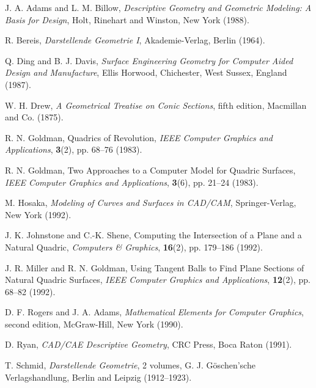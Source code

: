 \newpage
\begin{thebibliography}{99}

     J. A. Adams and L. M. Billow,
     {\em Descriptive Geometry and Geometric Modeling: A Basis for Design},
     Holt, Rinehart and Winston, New York (1988).

     R. Bereis,
     {\em Darstellende Geometrie I},
     Akademie-Verlag, Berlin (1964).

     Q. Ding and B. J. Davis,
     {\em Surface Engineering Geometry for Computer Aided Design and
          Manufacture},
     Ellis Horwood, Chichester, West Sussex, England (1987).

     W. H. Drew,
     {\em A Geometrical Treatise on Conic Sections},
     fifth edition,
     Macmillan and Co. (1875).

     R. N. Goldman,
     Quadrics of Revolution,
     {\em IEEE Computer Graphics and Applications},
     {\bf 3}(2), pp. 68--76 (1983).

     R. N. Goldman,
     Two Approaches to a Computer Model for Quadric Surfaces,
     {\em IEEE Computer Graphics and Applications},
     {\bf 3}(6), pp. 21--24 (1983).

     M. Hosaka,
     {\em Modeling of Curves and Surfaces in CAD/CAM},
     Springer-Verlag, New York (1992).

     J. K. Johnstone and C.-K. Shene,
     Computing the Intersection of a Plane and a Natural Quadric,
     {\em Computers \& Graphics},
     {\bf 16}(2), pp. 179--186 (1992).

     J. R. Miller and R. N. Goldman,
     Using Tangent Balls to Find Plane Sections of Natural Quadric Surfaces,
     {\em IEEE Computer Graphics and Applications},
     {\bf 12}(2), pp. 68--82 (1992).

     D. F. Rogers and J. A. Adams,
     {\em Mathematical Elements for Computer Graphics},
     second edition,
     McGraw-Hill, New York (1990).

     D. Ryan,
     {\em CAD/CAE Descriptive Geometry},
     CRC Press, Boca Raton (1991).

     T. Schmid,
     {\em Darstellende Geometrie}, 2 volumes,
     G. J. G\"{o}schen'sche Verlagshandlung,
     Berlin and Leipzig (1912--1923).


\end{thebibliography}
